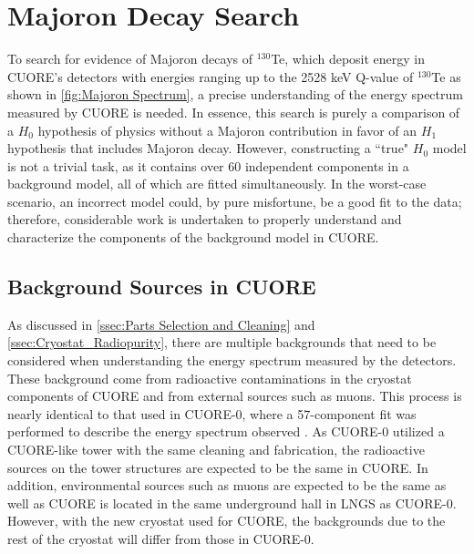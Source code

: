 \chapter{Majoron Decay Search}
\label{ch:Background Model}
To search for evidence of Majoron decays of $^{130}$Te, which deposit energy in CUORE's detectors with energies ranging up to the 2528 keV Q-value of $^{130}$Te as shown in \autoref{fig:Majoron Spectrum}, a precise understanding of the energy spectrum measured by CUORE is needed.
In essence, this search is purely a comparison of a $H_0$ hypothesis of physics without a Majoron contribution in favor of an $H_1$ hypothesis that includes Majoron decay.
However, constructing a ``true" $H_0$ model is not a trivial task, as it contains over 60 independent components in a background model, all of which are fitted simultaneously.
In the worst-case scenario, an incorrect model could, by pure misfortune, be a good fit to the data; therefore, considerable work is undertaken to properly understand and characterize the components of the background model in CUORE.

\section{Background Sources in CUORE}
As discussed in \autoref{ssec:Parts Selection and Cleaning} and \autoref{ssec:Cryostat_Radiopurity}, there are multiple backgrounds that need to be considered when understanding the energy spectrum measured by the detectors.
These background come from radioactive contaminations in the cryostat components of CUORE and from external sources such as muons.
This process is nearly identical to that used in CUORE-0, where a 57-component fit was performed to describe the energy spectrum observed \cite{Alduino:2016vtd}.
As CUORE-0 utilized a CUORE-like tower with the same cleaning and fabrication, the radioactive sources on the tower structures are expected to be the same in CUORE.
In addition, environmental sources such as muons are expected to be the same as well as CUORE is located in the same underground hall in LNGS as CUORE-0.
However, with the new cryostat used for CUORE, the backgrounds due to the rest of the cryostat will differ from those in CUORE-0.

